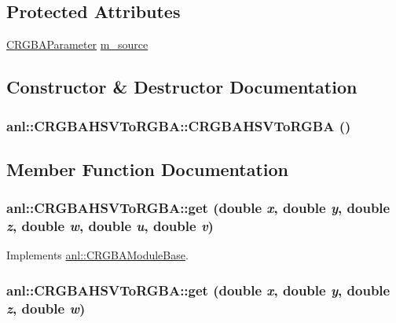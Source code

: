 \subsection*{Protected Attributes}
\begin{DoxyCompactItemize}
\item 
\hyperlink{classanl_1_1CRGBAParameter}{CRGBAParameter} \hyperlink{classanl_1_1CRGBAHSVToRGBA_aa732e8841a8e1e4cf8d4bbb01ae10ba2}{m\_\-source}
\end{DoxyCompactItemize}


\subsection{Constructor \& Destructor Documentation}
\hypertarget{classanl_1_1CRGBAHSVToRGBA_aba69497e15efbf87a6199cde006c585f}{
\subsubsection[{CRGBAHSVToRGBA}]{\setlength{\rightskip}{0pt plus 5cm}anl::CRGBAHSVToRGBA::CRGBAHSVToRGBA ()}}
\label{classanl_1_1CRGBAHSVToRGBA_aba69497e15efbf87a6199cde006c585f}


\subsection{Member Function Documentation}
\hypertarget{classanl_1_1CRGBAHSVToRGBA_adb2d92c8bc56e5996580e111bb8cd703}{
\subsubsection[{get}]{ anl::CRGBAHSVToRGBA::get (double {\em x}, \/  double {\em y}, \/  double {\em z}, \/  double {\em w}, \/  double {\em u}, \/  double {\em v})}}
\label{classanl_1_1CRGBAHSVToRGBA_adb2d92c8bc56e5996580e111bb8cd703}


Implements \hyperlink{classanl_1_1CRGBAModuleBase_aa5a0b719101302596a697aa8c2292f55}{anl::CRGBAModuleBase}.\hypertarget{classanl_1_1CRGBAHSVToRGBA_ab5fff0b979c8278e0268a1f3ef924572}{
\subsubsection[{get}]{ anl::CRGBAHSVToRGBA::get (double {\em x}, \/  double {\em y}, \/  double {\em z}, \/  double {\em w})}}
\label{classanl_1_1CRGBAHSVToRGBA_ab5fff0b979c8278e0268a1f3ef924572}


